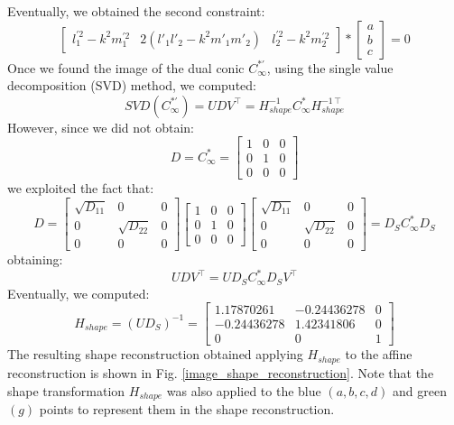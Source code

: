 \documentclass[11pt, oneside]{article}
\begin{document}
Eventually, we obtained the second constraint:
\begin{equation}
	\begin{bmatrix}
		l_1^{'2} - k^2 m_1^{'2} & 2 (l'_1 l'_2 - k^2 m'_1 m'_2) & l_2^{'2} - k^2 m_2^{'2}
	\end{bmatrix}
	*
	\begin{bmatrix}
		a \\ b \\ c
	\end{bmatrix}
	= 0
\end{equation}
Once we found the image of the dual conic $C^{*'}_\infty$, using the single value decomposition (SVD) method, we computed:
\begin{equation}
	SVD(C^{*'}_\infty) = U D V^\intercal = H_{shape}^{-1} C^*_\infty H_{shape}^{-1\intercal}
\end{equation}
However, since we did not obtain:
\begin{equation}
	D = C^*_\infty =
	\begin{bmatrix}
		1 & 0 & 0 \\ 0 & 1 & 0 \\ 0 & 0 & 0
	\end{bmatrix}
\end{equation}
we exploited the fact that:
\begin{equation}
	D =
	\begin{bmatrix}
		\sqrt{D_{11}} & 0 & 0 \\ 0 & \sqrt{D_{22}} & 0 \\ 0 & 0 & 0
	\end{bmatrix}
	\begin{bmatrix}
		1 & 0 & 0 \\ 0 & 1 & 0 \\ 0 & 0 & 0
	\end{bmatrix}
	\begin{bmatrix}
		\sqrt{D_{11}} & 0 & 0 \\ 0 & \sqrt{D_{22}} & 0 \\ 0 & 0 & 0
	\end{bmatrix}
	= D_S C^*_\infty D_S
\end{equation}
obtaining:
\begin{equation}
	U D V^\intercal = U D_S C^*_\infty D_S V^\intercal
\end{equation}
Eventually, we computed:
\begin{equation}
	H_{shape} = (U D_S)^{-1} = 
	\begin{bmatrix}
		1.17870261 & -0.24436278 & 0 \\
		-0.24436278 & 1.42341806 & 0 \\
		0 & 0 & 1
	\end{bmatrix}
\end{equation}
The resulting shape reconstruction obtained applying $H_{shape}$ to the affine reconstruction is shown in Fig. \ref{image_shape_reconstruction}. Note that the shape transformation $H_{shape}$ was also applied to the blue $(a, b, c, d)$ and green $(g)$ points to represent them in the shape reconstruction.
\end{document}
